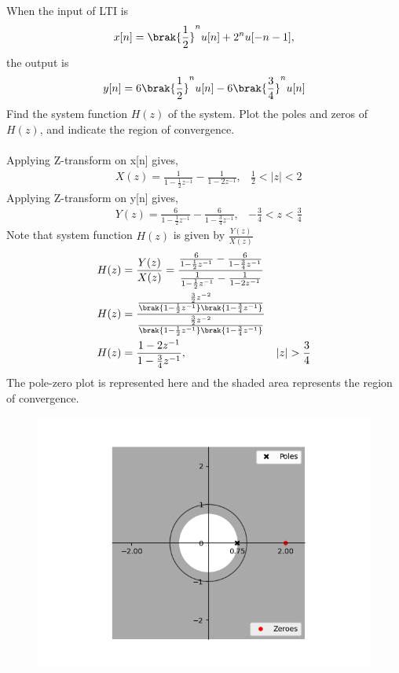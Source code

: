 \documentclass[journal,12pt,twocolumn]{IEEEtran}
\begin{document}
\problem When the input of LTI is
\begin{align}
    x[n] = \brak{\frac{1}{2}}^{n} u[n] + 2^n u[-n-1],
\end{align}
the output is
\begin{align}
    y[n] = 6\brak{\frac{1}{2}}^n u[n] - 6\brak{\frac{3}{4}}^n u[n]
\end{align}
Find the system function $H(z)$ of the system. Plot the poles and zeros of $H(z)$, and indicate the region of convergence.
\\
\solution \\
Applying Z-transform on x[n] gives,
\begin{align}
  &  X(z) = \frac{1}{1 - \frac{1}{2} z^{-1}} - \frac{1}{1 - 2z^{-1}}, 
  &  \frac{1}{2} < |{z}| < 2
\end{align}
Applying Z-transform on y[n] gives,
\begin{align}
  & Y(z) = \frac{6}{1 - \frac{1}{2} z^{-1}} - \frac{6}{1 - \frac{3}{4}z^{-1}}, 
  &  -\frac{3}{4} < {z} < \frac{3}{4}
\end{align}
Note that system function $H(z)$ is given by $\frac{Y(z)}{X(z)}$
\begin{align}
  & H(z) = \frac{Y(z)}{X(z)} = \frac{\frac{6}{1 - \frac{1}{2} z^{-1}} - \frac{6}{1 - \frac{3}{4}z^{-1}}}{\frac{1}{1 - \frac{1}{2} z^{-1}} - \frac{1}{1 - 2z^{-1}}} \\
  & H(z) = \frac{\frac{\frac{3}{2}z^{-2}}{\brak{1-\frac{1}{2}z^{-1}}\brak{1 - \frac{3}{4}z^{-1}}}}{\frac{\frac{3}{2}z^{-2}}{\brak{1-\frac{1}{2}z^{-1}}\brak{1 - \frac{3}{4}z^{-1}}}} \\
  & H(z) = \frac{1-2z^{-1}}{1 - \frac{3}{4}z^{-1}},
  & |z| > \frac{3}{4}
\end{align}
The pole-zero plot is represented here and the shaded area represents the region of convergence.
\begin{figure}[h]
    \begin{center}
    \includegraphics[scale = 0.5]{figs/plot.png}
    \end{center}
\end{figure}
\end{document}
